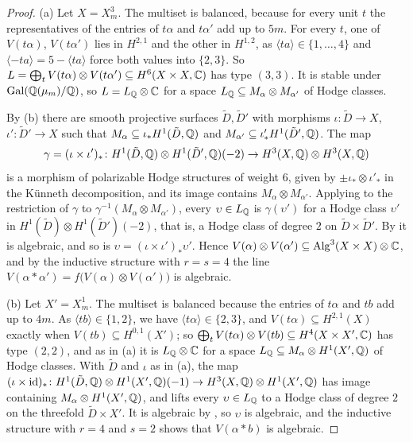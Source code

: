 \begin{proof}
(a) Let $X=X^{3}_{m}$. The multiset is balanced, because for every unit $t$
the representatives of the entries of $t\alpha$ and $t\alpha'$ add up to
$5m$. For every $t$, one of $V(t\alpha)$, $V(t\alpha')$ lies in $H^{2,1}$
and the other in $H^{1,2}$, as $\langle ta\rangle\in\{1,\dots,4\}$ and
$\langle-ta\rangle=5-\langle ta\rangle$ force both values into $\{2,3\}$. So
$L=\bigoplus_{t}V(t\alpha)\otimes V(t\alpha')\subseteq H^{6}(X\times X,\mathbb{C})$
has type $(3,3)$. It is stable under $\operatorname{Gal}(\mathbb{Q}(\mu_{m})/\mathbb{Q})$,
so $L=L_{\mathbb{Q}}\otimes\mathbb{C}$ for a space $L_{\mathbb{Q}}\subseteq M_{\alpha}\otimes
M_{\alpha'}$ of Hodge classes.

By (b) there are smooth projective surfaces $\tilde D,\tilde D'$
with morphisms $\iota\colon\tilde D\to X$, $\iota'\colon\tilde D'\to X$ such
that $M_{\alpha}\subseteq\iota_{*}H^{1}(\tilde D,\mathbb{Q})$ and $M_{\alpha'}
\subseteq\iota'_{*}H^{1}(\tilde D',\mathbb{Q})$. The map
\[
  \gamma=(\iota\times\iota')_{*}\colon H^{1}(\tilde D,\mathbb{Q})\otimes
  H^{1}(\tilde D',\mathbb{Q})(-2)\to H^{3}(X,\mathbb{Q})\otimes H^{3}(X,\mathbb{Q})
\]
is a morphism of polarizable Hodge structures of weight $6$, given by
$\pm\iota_{*}\otimes\iota'_{*}$ in the K\"unneth decomposition, and its image
contains $M_{\alpha}\otimes M_{\alpha'}$. Applying  to the
restriction of $\gamma$ to $\gamma^{-1}(M_{\alpha}\otimes M_{\alpha'})$,
every $\upsilon\in L_{\mathbb{Q}}$ is $\gamma(\upsilon')$ for a Hodge class
$\upsilon'$ in $H^{1}(\tilde D)\otimes H^{1}(\tilde D')(-2)$, that is, a
Hodge class of degree $2$ on $\tilde D\times\tilde D'$. By 
it is algebraic, and so is $\upsilon=(\iota\times\iota')_{*}\upsilon'$.
Hence $V(\alpha)\otimes V(\alpha')\subseteq\operatorname{Alg}^{3}(X\times X)\otimes\mathbb{C}$,
and by the inductive structure with $r=s=4$ the line $V(\alpha*\alpha')=
f\bigl(V(\alpha)\otimes V(\alpha')\bigr)$ is algebraic.

(b) Let $X'=X^{1}_{m}$. The multiset is balanced because the entries of
$t\alpha$ and $tb$ add up to $4m$. As $\langle tb\rangle\in\{1,2\}$, we have
$\langle t\alpha\rangle\in\{2,3\}$, and $V(t\alpha)\subseteq H^{2,1}(X)$
exactly when $V(tb)\subseteq H^{0,1}(X')$; so $\bigoplus_{t}V(t\alpha)
\otimes V(tb)\subseteq H^{4}(X\times X',\mathbb{C})$ has type $(2,2)$, and as in (a)
it is $L_{\mathbb{Q}}\otimes\mathbb{C}$ for a space $L_{\mathbb{Q}}\subseteq M_{\alpha}\otimes
H^{1}(X',\mathbb{Q})$ of Hodge classes. With $\tilde D$ and $\iota$ as in (a), the
map $(\iota\times\mathrm{id})_{*}\colon H^{1}(\tilde D,\mathbb{Q})\otimes
H^{1}(X',\mathbb{Q})(-1)\to H^{3}(X,\mathbb{Q})\otimes H^{1}(X',\mathbb{Q})$ has image containing
$M_{\alpha}\otimes H^{1}(X',\mathbb{Q})$, and  lifts every
$\upsilon\in L_{\mathbb{Q}}$ to a Hodge class of degree $2$ on the threefold
$\tilde D\times X'$. It is algebraic by , so $\upsilon$ is
algebraic, and the inductive structure with $r=4$ and $s=2$ shows that
$V(\alpha*b)$ is algebraic.
\end{proof}


